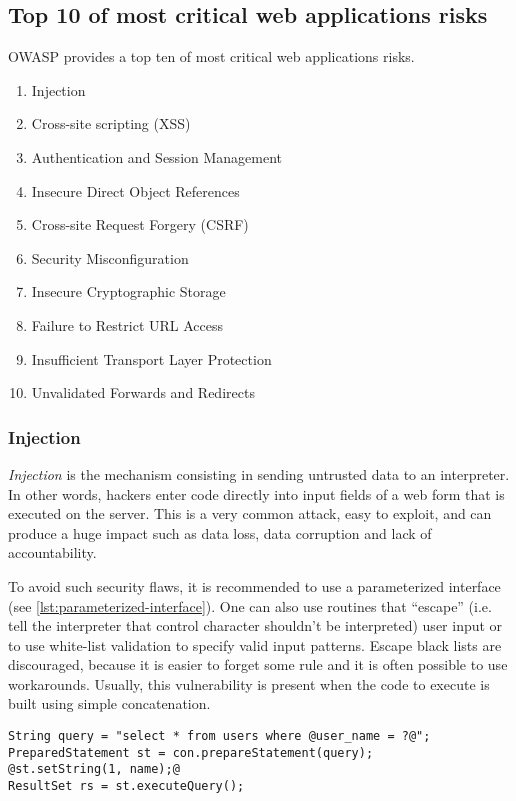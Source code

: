 \subsection{Top 10 of most critical web applications risks}

OWASP provides a top ten of most critical web applications risks.
\begin{enumerate}
\item Injection
\item Cross-site scripting (XSS)
\item Authentication and Session Management
\item Insecure Direct Object References
\item Cross-site Request Forgery (CSRF)
\item Security Misconfiguration
\item Insecure Cryptographic Storage
\item Failure to Restrict URL Access
\item Insufficient Transport Layer Protection
\item Unvalidated Forwards and Redirects
\end{enumerate}

\subsubsection{Injection}

\emph{Injection} is the mechanism consisting in sending untrusted data to an
interpreter. In other words, hackers enter code directly into input fields of
a web form that is executed on the server.
This is a very common attack, easy to exploit, and can produce a huge impact
such as data loss, data corruption and lack of accountability.


To avoid such security flaws, it is recommended to use a parameterized
interface (see \autoref{lst:parameterized-interface}). One can also use
routines that ``escape'' (i.e. tell the interpreter that control
character shouldn't be interpreted) user input or to
use white-list validation to specify valid input patterns. Escape
black lists are discouraged, because it is easier to forget some rule and
it is often possible to use workarounds.
Usually, this vulnerability is present when the code to execute is built using
simple concatenation.

\begin{lstlisting}[style=beamer,
	caption={Parameterized interface in Java},
	label=lst:parameterized-interface]
String query = "select * from users where @user_name = ?@";
PreparedStatement st = con.prepareStatement(query);
@st.setString(1, name);@
ResultSet rs = st.executeQuery();
\end{lstlisting}

